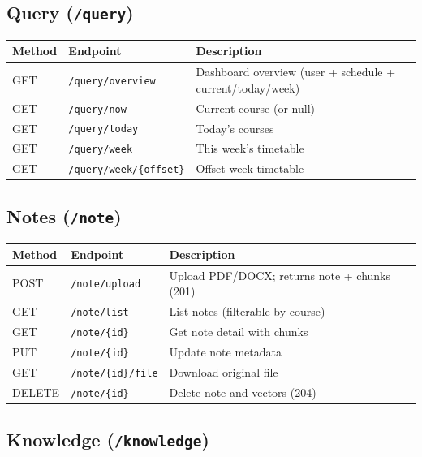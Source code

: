 \documentclass[12pt,a4paper]{article}
\begin{document}
\subsection{Query (\texttt{/query})}

\begin{longtable}{@{}llp{7cm}@{}}
\toprule
\textbf{Method} & \textbf{Endpoint} & \textbf{Description} \\
\midrule
\endhead
GET & \texttt{/query/overview} & Dashboard overview (user + schedule + current/today/week) \\
GET & \texttt{/query/now} & Current course (or null) \\
GET & \texttt{/query/today} & Today's courses \\
GET & \texttt{/query/week} & This week's timetable \\
GET & \texttt{/query/week/\{offset\}} & Offset week timetable \\
\bottomrule
\end{longtable}

\subsection{Notes (\texttt{/note})}

\begin{longtable}{@{}llp{7cm}@{}}
\toprule
\textbf{Method} & \textbf{Endpoint} & \textbf{Description} \\
\midrule
\endhead
POST & \texttt{/note/upload} & Upload PDF/DOCX; returns note + chunks (201) \\
GET & \texttt{/note/list} & List notes (filterable by course) \\
GET & \texttt{/note/\{id\}} & Get note detail with chunks \\
PUT & \texttt{/note/\{id\}} & Update note metadata \\
GET & \texttt{/note/\{id\}/file} & Download original file \\
DELETE & \texttt{/note/\{id\}} & Delete note and vectors (204) \\
\bottomrule
\end{longtable}

\subsection{Knowledge (\texttt{/knowledge})}
\end{document}
